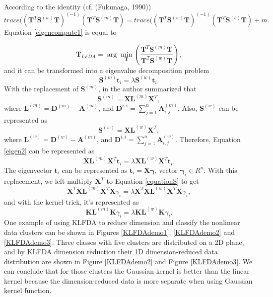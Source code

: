 \noindent According to the identity (cf. (Fukunaga, 1990))
\begin{equation}
trace((\bm{T}^T\bm{S}^{(w)}\bm{T})^{(-1)}(\bm{T}^T\bm{S}^{(m)}\bm{T}) = trace((\bm{T}^T\bm{S}^{(w)}\bm{T})^{(-1)}(\bm{T}^T\bm{S}^{(b)}\bm{T}) + m.
\end{equation}
Equation \ref{eigencompute1} is equal to 

\begin{equation}
\bm{T}_{LFDA}  = \arg\min_{\bm{T}} (\frac{\bm{T}^T\bm{S}^{(m)}\bm{T}}{\bm{T}^T\bm{S}^{(w)}\bm{T}}),
\end{equation}
and it can be transformed into a eigenvalue decomposition problem 
\begin{equation}\label{eigen2}
\bm{S}^{(m)}\bm{t}_i  = \lambda \bm{S}^{(w)}\bm{t}_i.
\end{equation}
With the replacement of $\bm{S}^{(m)}$, in \cite{KLFDA} the author summarized that 
\begin{equation}
\bm{S}^{(m)} = \bm{X}\bm{L}^{(m)}\bm{X}^T,
\end{equation}
where $\bm{L}^{(m)}  = \bm{D}^{(m)} - \bm{A}^{(m)}$, and $ \bm{D}^{i,i} = \sum_{j=1}^n  \bm{A}_{i,j}^{(m)}$. Also, $\bm{S}^{(w)}$ can be represented as 
\begin{equation}
\bm{S}^{(w)} = \bm{X}\bm{L}^{(w)}\bm{X}^T,
\end{equation}
where $\bm{L}^{(w)}  = \bm{D}^{(w)} - \bm{A}^{(m)}$, and $ \bm{D}^{i,i} = \sum_{j=1}^n  \bm{A}_{i,j}^{(w)}$. 
Therefore, Equation \ref{eigen2} can be represented as
\begin{equation}\label{equationS}
\bm{X}\bm{L}^{(m)}\bm{X}^T \bm{t}_i= \lambda\bm{X}\bm{L}^{(w)}\bm{X}^T \bm{t}_i.
\end{equation}
The eigenvector $\bm{t}_i$  can be represented as $\bm{t}_i = \bm{X}\bm{\gamma}$, vector $\bm{\gamma}_i \in R^n$. With this replacement, we left multiply $\bm{X}^T$ to Equation \ref{equationS} to get 
\begin{equation}
\bm{X}^T\bm{X}\bm{L}^{(m)}\bm{X}^T\bm{X}\gamma_i = \lambda\bm{X}^T\bm{X}\bm{L}^{(w)}\bm{X}^T \bm{X}\gamma_i,
\end{equation}
and with the kernel trick, it's represented as
\begin{equation}
\bm{K}\bm{L}^{(m)}\bm{K}\gamma_i  = \lambda \bm{K}\bm{L}^{(w)}\bm{K}\gamma_i.
\end{equation}
One example of using KLFDA to reduce dimension and classify the nonlinear data clusters can be shown in Figures \ref{KLFDAdemo1}, \ref{KLFDAdemo2} and \ref{KLFDAdemo3}. Three classes with five clusters are distributed on a 2D plane, and by KLFDA dimension reduction their 1D dimension-reduced data distribution are shown in Figure \ref{KLFDAdemo2} and Figure \ref{KLFDAdemo3}. We can conclude that for those clusters the Gaussian kernel is better than the linear kernel because the dimension-reduced data is more separate when using Gaussian kernel function.

